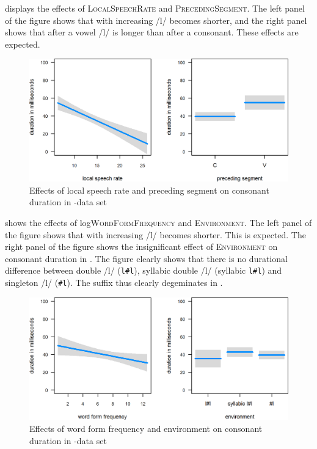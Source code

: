 displays the effects of \textsc{LocalSpeechRate} and \textsc{PrecedingSegment}. The left panel of the figure shows that with increasing  /l/ becomes shorter, and the right panel shows that after a vowel /l/ is longer than after a consonant. These effects are expected.





\begin{figure}
	
		
	\includegraphics[scale=.8] {images/Corpus/lyModelcov.png}
	\caption{Effects of local speech rate and preceding segment on consonant duration in -data set}
	\label{fig:corpus covariates ly}
\end{figure}





 shows the effects of log\textsc{WordFormFrequency} and \textsc{Environment}.
The left panel of the figure shows that with increasing  /l/ becomes shorter. This is expected.
The right panel of the figure shows the insignificant effect of \textsc{Environment} on consonant duration in . The figure clearly shows that there is no durational difference between double /l/ (\texttt{l\#l}), syllabic double /l/ (syllabic \texttt{l\#l}) and singleton /l/ (\texttt{\#l}). The suffix  thus clearly degeminates in . 


\begin{figure}
	

	\includegraphics[scale=.8] {images/Corpus/lyModelTransitionTypeAndFreq.png}
	\caption{Effects of word form frequency  and environment on consonant duration in -data set}
	\label{fig:corpus main effects  ly}
\end{figure}




